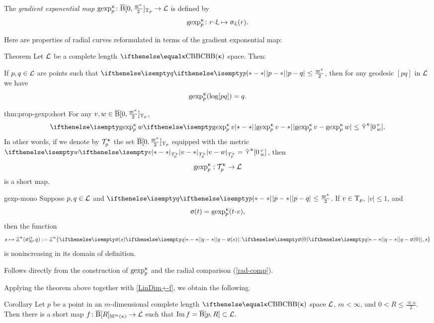 The \emph{gradient exponential map} 
$\gexp\mc\kappa_p\:\cBall[\0,\tfrac{\varpi\kappa}2]_{\T_p}\to \spc{L}$
is defined by
\[
\gexp\mc\kappa_p\: r\cdot\xi\mapsto\sigma_\xi(r).
\]



Here are properties of radial curves reformulated in terms of the gradient exponential map:

\begin{thm}{Theorem}\label{thm:prop-gexp}
Let $\mathcal{L}$ be a complete length $\Alex{\kappa}$ space. 
Then:
\begin{subthm}{}
If $p,q\in \spc{L}$ are points such that $\dist{p}{q}{}\le\tfrac{\varpi\kappa}2$, then for any geodesic $[pq]$ in $\mathcal{L}$ we have
\[\mathop{\rm gexp}\nolimits^{\upkappa}_p(\mathrm{log}[{p}{q}])=q.\] 
\end{subthm}

\begin{subthm}{thm:prop-gexp:short} 
For any $v,w\in \cBall[\0,\tfrac{\varpi\kappa}2]_{\T_p}$,
\[\dist{\gexp\mc\kappa_p v}{\gexp\mc\kappa_p w}{}
\le
\side\kappa\hinge{\0}v w.\]
In other words, if we denote by $\mathcal{T}_{p}^{\upkappa}$ the set $\cBall[\0,\tfrac{\varpi\kappa}2]_{\T_p}$ 
equipped with the metric $\dist{v}{w}{\mathcal{T}\mc\kappa_{p}}=\side\kappa\hinge{\0}v w$, 
then 
\[\gexp\mc\kappa_p:\mathcal{T}\mc\kappa_{p}\to \spc{L}\] 
is a short map.
\end{subthm}

\begin{subthm}{gexp-mono} 
Suppose
$p, q\in \spc{L}$ 
and $\dist{p}{q}{}\le \tfrac{\varpi\kappa}2$.
If $v\in\T_p$, $|v|\le 1$, and 
\[\sigma(t)=\gexp\mc\kappa_p(t\cdot v),\]
then the function
\[
s
\mapsto 
\tangle\mc\kappa(\sigma|_0^s,q)
\df
\tangle\mc\kappa\{\dist{q}{\sigma(s)}{};\dist{q}{\sigma(0)}{},s\}
\]
is nonincreasing in its domain of definition.
\end{subthm}
\end{thm}

Follows directly from the construction of $\mathop{\rm gexp}\nolimits^{\upkappa}_p$ and the radial comparison (\ref{rad-comp}).
\qeds

Applying the theorem above together with \ref{LinDim+-f},
we obtain the following.

{\sloppy 
 
\begin{thm}{Corollary}\label{cor:short-map-to-ball}
Let $p$ be a point in an $m$-dimensional complete length $\Alex\kappa$ space $\mathcal{L}$,
$m<\infty$, and $0<R\le\tfrac{\varpi\kappa}2$.
Then there is a short map 
$f\:\cBall[R]_{\Lob{m}{\kappa}}\to \spc{L}$
such that $\Im f= \cBall[p,R]\subset \spc{L}$.
\end{thm}

}





